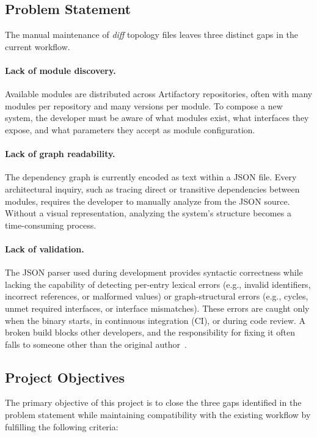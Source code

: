 \subsection{Problem Statement}
The manual maintenance of \textit{diff} topology files leaves three distinct gaps in the current workflow. 

\paragraph{Lack of module discovery.}
Available modules are distributed across Artifactory repositories, often with many modules per repository and many versions per module. To compose a new system, the developer must be aware of what modules exist, what interfaces they expose, and what parameters they accept as module configuration.

\paragraph{Lack of graph readability.}
The dependency graph is currently encoded as text within a JSON file. Every architectural inquiry, such as tracing direct or transitive dependencies between modules, requires the developer to manually analyze from the JSON source. Without a visual representation, analyzing the system's structure becomes a time-consuming process.

\paragraph{Lack of validation.}
The JSON parser used during development provides syntactic correctness while lacking the capability of detecting per-entry lexical errors (e.g., invalid identifiers, incorrect references, or malformed values) or graph-structural errors (e.g., cycles, unmet required interfaces, or interface mismatches). These errors are caught only when the binary starts, in continuous integration (CI), or during code review. A broken build blocks other developers, and the responsibility for fixing it often falls to someone other than the original author~\cite{humble2010continuous}.

\subsection{Project Objectives}
The primary objective of this project is to close the three gaps identified in the problem statement while maintaining compatibility with the existing workflow by fulfilling the following criteria:

